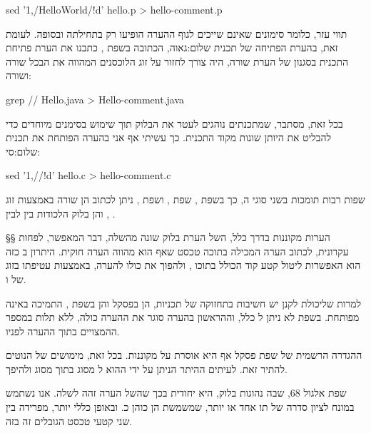 \bash
sed '1,/HelloWorld/!d' hello.p > hello-comment.p
\END

\begin{קוד}

\end{קוד}

תווי עזר, כלומר סימונים שאינם שייכים לגוף ההערה הופיעו רק בתחילתה ובסופה.
לעומת זאת, בהערת הפתיחה של  תכנית שלום:גאוה, הכתובה בשפת , כתבנו את
הערת פתיחת התכנית בסגנון של הערת שורה, היה צורך לחזור על זוג הלוכסנים המהווה
את ה בכל שורה ושורה:
\begin{קוד}
\bash
grep // Hello.java > Hello-comment.java
\END

\end{קוד}
בכל זאת, מסתבר, שמתכנתים נוהגים לעטר את  הבלוק תוך שימוש בסימנים מיוחדים
כדי להבליט את היותן שונות מקוד התכנית. כך עשיתי אף אני בהערה הפותחת את 
תכנית שלום:סי{}:

\begin{קוד}
\bash
sed '1,/\*\//!d' hello.c > hello-comment.c
\END

\end{קוד}

שפות רבות תומכות בשני סוגי ה, כך בשפת , שפת , ושפת
, ניתן לכתוב הן  שורה באמצעות זוג , והן  בלוק
הלכודות בין  לבין .

§§ הערות מקוננות
בדרך כלל, ה של הערת בלוק שונה מה שלה, דבר המאפשר, לפחות עקרונית,
לכתוב הערה המכילה בתוכה טכסט שאף הוא מהווה הערה חוקית. היתרון ב 
כזה הוא האפשרות ליטול קטע קוד הכולל בתוכו , ולהפוך את כולו להערה,
באמצעות עטיפתו בזוג של  ו.

למרות שליכולת לקנן  יש חשיבות בתחזוקה של תכניות, הן בפסקל והן בשפת ,
התמיכה ב אינה מפותחת. בשפת  לא ניתן ל  כלל,
וה הראשון בהערה סוגר את ההערה כולה, ללא תלות במספר ה המצויים בתוך
ההערה לפניו.

ההגדרה הרשמית של שפת פסקל אף היא אוסרת על  מקוננות. בכל זאת, מימושים של
ה נוטים להתיר זאת. לעיתים ההיתר הניתן על ידי ה הוא ל 
מסוג  בתוך  מסוג 
ולהיפך.

שפת אלגול 68, שבה נהוגות  בלוק, היא יחודית בכך שה של הערה זהה
ל שלה. אנו נשתמש במונח  לציון סדרה של תו אחד או יותר, שמשמשת הן
כ והן כ. ובאופן כללי יותר,  מפרידה בין שני קטעי טכסט הגובלים זה
בזה.


